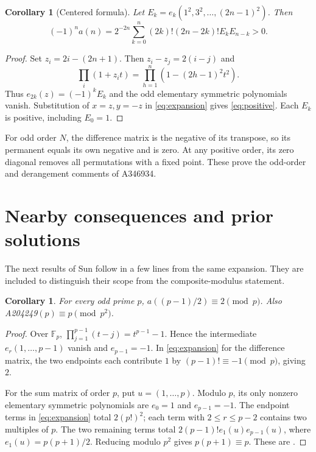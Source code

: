 \documentclass[11pt]{article}
\newtheorem{corollary}[theorem]{Corollary}
\begin{document}
\begin{corollary}[Centered formula]\label{positive}
Let $E_k=e_k(1^2,3^2,\ldots,(2n-1)^2)$. Then
\begin{equation}\label{eq:positive}
 (-1)^n a(n)=2^{-2n}\sum_{k=0}^n(2k)!(2n-2k)!E_kE_{n-k}>0.
\end{equation}
\end{corollary}
\begin{proof}
Set $z_i=2i-(2n+1)$. Then $z_i-z_j=2(i-j)$ and
\[
 \prod_i(1+z_it)=\prod_{h=1}^n(1-(2h-1)^2t^2).
\]
Thus $e_{2k}(z)=(-1)^kE_k$ and the odd elementary symmetric
polynomials vanish. Substitution of $x=z,y=-z$ in
\eqref{eq:expansion} gives \eqref{eq:positive}.
Each $E_k$ is positive, including $E_0=1$.
\end{proof}

For odd order $N$, the difference matrix is the negative of its
transpose, so its permanent equals its own negative and is zero.
At any positive order, its zero diagonal removes all permutations
with a fixed point. These prove the odd-order and derangement
comments of A346934.

\section{Nearby consequences and prior solutions}
The next results of Sun \cite{sun} follow in a few lines from the same
expansion. They are included to distinguish their scope from the
composite-modulus statement.
\begin{corollary}\label{prime}
For every odd prime $p$, $a((p-1)/2)\equiv2\pmod p$.
Also A204249$(p)\equiv p\pmod{p^2}$.
\end{corollary}
\begin{proof}
Over $\mathbb F_p$, $\prod_{j=1}^{p-1}(t-j)=t^{p-1}-1$.
Hence the intermediate $e_r(1,\ldots,p-1)$ vanish and
$e_{p-1}=-1$. In \eqref{eq:expansion} for the difference
matrix, the two endpoints each contribute $1$ by
$(p-1)!\equiv-1\pmod p$, giving $2$.

For the sum matrix of order $p$, put $u=(1,\ldots,p)$.
Modulo $p$, its only nonzero elementary symmetric polynomials are
$e_0=1$ and $e_{p-1}=-1$.
The endpoint terms in \eqref{eq:expansion} total $2(p!)^2$;
each term with $2\le r\le p-2$ contains two multiples of $p$.
The two remaining terms total
$2(p-1)!e_1(u)e_{p-1}(u)$, where $e_1(u)=p(p+1)/2$.
Reducing modulo $p^2$ gives $p(p+1)\equiv p$.
These are \cite[Corollary 1.1, (1.11); Theorem 1.2(ii), (1.7)]{sun}.
\end{proof}
\end{document}
